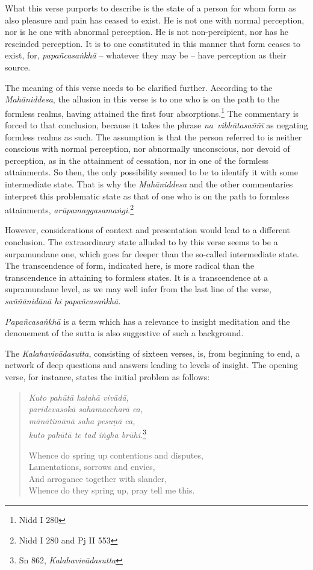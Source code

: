 What this verse purports to describe is the state of a person for whom form as also pleasure and pain has ceased to exist. He is not one with normal perception, nor is he one with abnormal perception. He is not non-percipient, nor has he rescinded perception. It is to one constituted in this manner that form ceases to exist, for, \emph{papañcasaṅkhā} -- whatever they may be -- have perception as their source.

The meaning of this verse needs to be clarified further. According to the \emph{Mahāniddesa}, the allusion in this verse is to one who is on the path to the formless realms, having attained the first four absorptions.\footnote{Nidd I 280} The commentary is forced to that conclusion, because it takes the phrase \emph{na~vibhūtasaññī} as negating formless realms as such. The assumption is that the person referred to is neither conscious with normal perception, nor abnormally unconscious, nor devoid of perception, as in the attainment of cessation, nor in one of the formless attainments. So then, the only possibility seemed to be to identify it with some intermediate state. That is why the \emph{Mahāniddesa} and the other commentaries interpret this problematic state as that of one who is on the path to formless attainments, \emph{arūpamaggasamaṅgi}.\footnote{Nidd I 280 and Pj II 553}

However, considerations of context and presentation would lead to a different conclusion. The extraordinary state alluded to by this verse seems to be a surpamundane one, which goes far deeper than the so-called intermediate state. The transcendence of form, indicated here, is more radical than the transcendence in attaining to formless states. It is a transcendence at a supramundane level, as we may well infer from the last line of the verse, \emph{saññānidānā hi papañcasaṅkhā.}

\emph{Papañcasaṅkhā} is a term which has a relevance to insight meditation and the denouement of the sutta is also suggestive of such a background.

The \emph{Kalahavivādasutta}, consisting of sixteen verses, is, from beginning to end, a network of deep questions and answers leading to levels of insight. The opening verse, for instance, states the initial problem as follows:

\begin{quote}
\emph{Kuto pahūtā kalahā vivādā,}\\
\emph{paridevasokā sahamaccharā ca,}\\
\emph{mānātimānā saha pesuṇā ca,}\\
\emph{kuto pahūtā te tad iṅgha brūhi.}\footnote{Sn 862, \emph{Kalahavivādasutta}}

Whence do spring up contentions and disputes,\\
Lamentations, sorrows and envies,\\
And arrogance together with slander,\\
Whence do they spring up, pray tell me this.
\end{quote}

